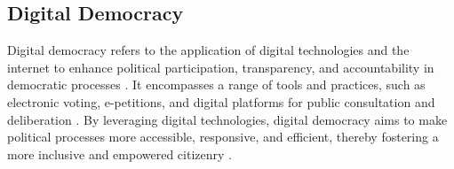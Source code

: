 \documentclass{IEEEtran}
\begin{document}



\subsection{Digital Democracy}

Digital democracy refers to the application of digital technologies and the internet to enhance political participation, transparency, and accountability in democratic processes \cite{ coleman2004democracy}. It encompasses a range of tools and practices, such as electronic voting, e-petitions, and digital platforms for public consultation and deliberation \cite{davis2005online}. By leveraging digital technologies, digital democracy aims to make political processes more accessible, responsive, and efficient, thereby fostering a more inclusive and empowered citizenry \cite{dahlberg2001extending}.
\end{document}
